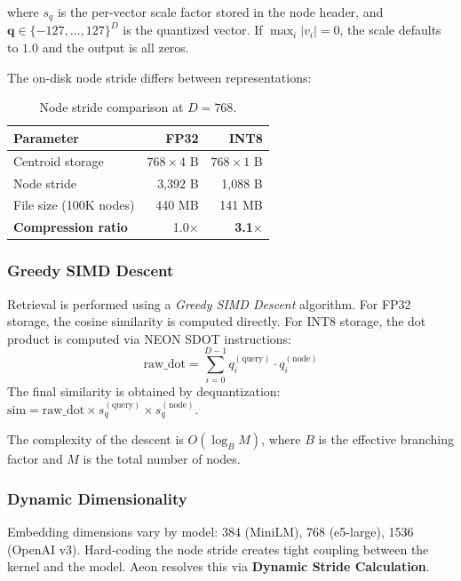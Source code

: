 \documentclass[10pt,twocolumn]{article}
\begin{document}
where $s_q$ is the per-vector scale factor stored in the node header, and $\mathbf{q} \in \{-127, \ldots, 127\}^D$ is the quantized vector. If $\max_i |v_i| = 0$, the scale defaults to $1.0$ and the output is all zeros.

The on-disk node stride differs between representations:
\begin{table}[!htbp]
\centering
\caption{Node stride comparison at $D=768$.}
\label{tab:node_stride}
\begin{tabular}{lrr}
\toprule
\textbf{Parameter} & \textbf{FP32} & \textbf{INT8} \\
\midrule
Centroid storage & $768 \times 4$ B & $768 \times 1$ B \\
Node stride & 3,392 B & 1,088 B \\
File size (100K nodes) & 440 MB & 141 MB \\
\textbf{Compression ratio} & 1.0$\times$ & \textbf{3.1$\times$} \\
\bottomrule
\end{tabular}
\end{table}

\subsubsection{Greedy SIMD Descent}
Retrieval is performed using a \textit{Greedy SIMD Descent} algorithm. For FP32 storage, the cosine similarity is computed directly. For INT8 storage, the dot product is computed via NEON SDOT instructions:
\begin{equation}
    \text{raw\_dot} = \sum_{i=0}^{D-1} q_i^{(\text{query})} \cdot q_i^{(\text{node})}
\end{equation}
The final similarity is obtained by dequantization: $\text{sim} = \text{raw\_dot} \times s_q^{(\text{query})} \times s_q^{(\text{node})}$.

The complexity of the descent is $O(\log_B M)$, where $B$ is the effective branching factor and $M$ is the total number of nodes.

\subsubsection{Dynamic Dimensionality}
\label{subsec:dynamic_dim}
Embedding dimensions vary by model: 384 (MiniLM), 768 (e5-large), 1536 (OpenAI v3). Hard-coding the node stride creates tight coupling between the kernel and the model. Aeon resolves this via \textbf{Dynamic Stride Calculation}.
\end{document}
